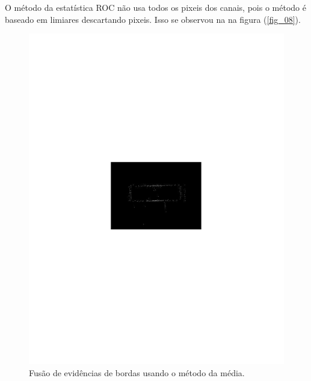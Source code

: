 \documentclass[conference]{IEEEtran}
\begin{document}
O método da estatística ROC não usa todos os pixeis dos canais, pois o método é baseado em limiares descartando pixeis. Isso se observou na na figura (\ref{fig_08}).
\begin{figure}[hbt]
	\includegraphics[scale=0.5]{flevoland_fusao_swt_crop.pdf}
	\caption{Fusão de evidências de bordas usando o método da média.}
\label{fig_05}
\end{figure}
\end{document}
